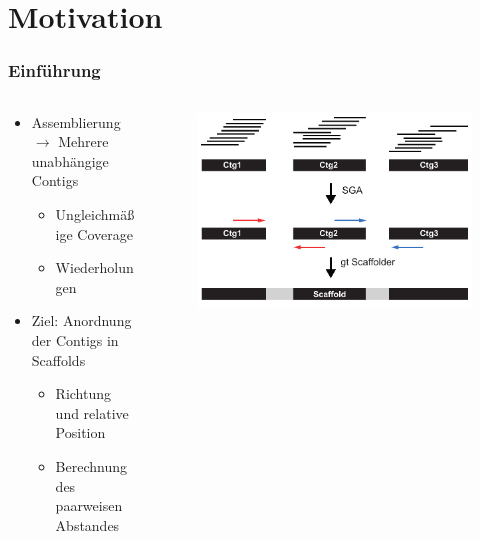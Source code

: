 \documentclass[xcolor=pst]{beamer}
\begin{document}
\section{Motivation}
\begin{frame}
\setcounter{framenumber}{1}
  \frametitle{Einführung}

  \begin{columns}
    \begin{column}{.45\textwidth}
      \begin{itemize}
      \item Assemblierung $\rightarrow$ Mehrere unabhängige Contigs
      \begin{itemize}
        \item Ungleichmäßige Coverage
        \item Wiederholungen
      \end{itemize}
      \item Ziel: Anordnung der Contigs in Scaffolds
      \begin{itemize}
        \item Richtung und relative Position
        \item Berechnung des paarweisen Abstandes
      \end{itemize}
      \end{itemize}
    \end{column}
    \begin{column}{.45\textwidth}
      \begin{center}
        \begin{figure}[t]
          \includegraphics[width=\textwidth,height=0.8\textheight,keepaspectratio]{figures/Scaffolding.pdf}
        \end{figure}
      \end{center}
    \end{column}
  \end{columns}
\end{frame}
\end{document}
